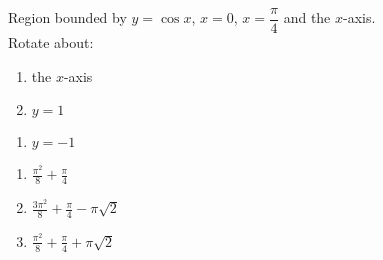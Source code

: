{Region bounded by $y=\cos x$, $x=0$, $x=\dfrac\pi4$ and the $x$-axis.\\
Rotate about:\\
\begin{minipage}[t]{.5\linewidth}
\begin{enumerate}
\item		the $x$-axis %
\item		$y=1$ %
\end{enumerate}
\end{minipage}%
\begin{minipage}[t]{.5\linewidth}
\begin{enumerate}\addtocounter{enumii}{2}
\item		$y=-1$ %
\end{enumerate}
\end{minipage}
}
{\begin{enumerate}
\item $\frac{\pi^2}8+\frac\pi4$
\item $\frac{3\pi^2}8+\frac\pi4-\pi\sqrt2$
\item $\frac{\pi^2}8+\frac\pi4+\pi\sqrt2$
\end{enumerate}
}
